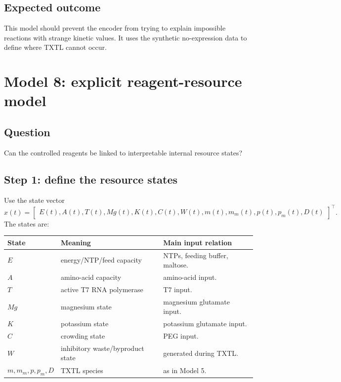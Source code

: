 \documentclass[11pt]{article}
\begin{document}
\subsection{Expected outcome}

This model should prevent the encoder from trying to explain impossible reactions with strange kinetic values. It uses the synthetic no-expression data to define where TXTL cannot occur.

\section{Model 8: explicit reagent-resource model}

\subsection{Question}
Can the controlled reagents be linked to interpretable internal resource states?

\subsection{Step 1: define the resource states}

Use the state vector
\begin{equation}
    x(t)=
    \begin{bmatrix}
        E(t),
        A(t),
        T(t),
        Mg(t),
        K(t),
        C(t),
        W(t),
        m(t),
        m_m(t),
        p(t),
        p_m(t),
        D(t)
    \end{bmatrix}^{\top}.
\end{equation}
The states are:
\begin{center}
\begin{tabularx}{\textwidth}{llX}
\toprule
State & Meaning & Main input relation \\
\midrule
$E$ & energy/NTP/feed capacity & NTPs, feeding buffer, maltose. \\
$A$ & amino-acid capacity & amino-acid input. \\
$T$ & active T7 RNA polymerase & T7 input. \\
$Mg$ & magnesium state & magnesium glutamate input. \\
$K$ & potassium state & potassium glutamate input. \\
$C$ & crowding state & PEG input. \\
$W$ & inhibitory waste/byproduct state & generated during TXTL. \\
$m,m_m,p,p_m,D$ & TXTL species & as in Model 5. \\
\bottomrule
\end{tabularx}
\end{center}
\end{document}
